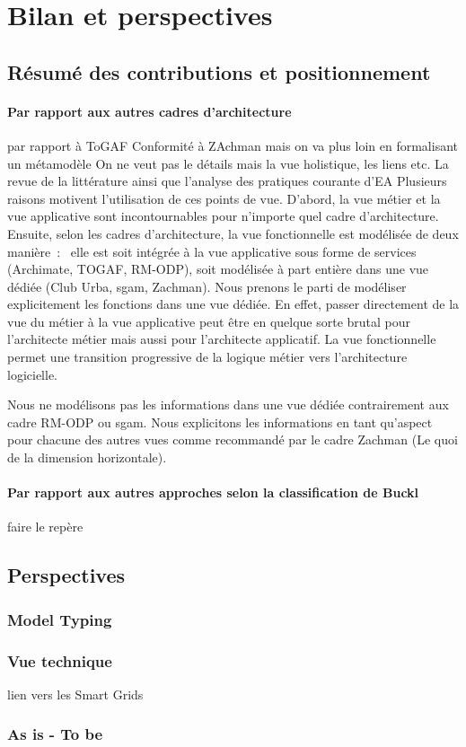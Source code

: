 \chapter{Bilan et perspectives}
\label{ch:bilan}

\PartialToc

\section{Résumé des contributions et positionnement}



\subsubsection{Par rapport aux autres cadres d'architecture}
par rapport à ToGAF
Conformité à ZAchman mais on va plus loin en formalisant un métamodèle
On ne veut pas le détails mais la vue holistique, les liens etc.
La revue de la littérature ainsi que
l'analyse des pratiques courante d'EA Plusieurs raisons
motivent l'utilisation de ces points de vue. D'abord, la vue métier et la vue
applicative sont incontournables pour n'importe quel cadre d'architecture.
Ensuite, selon les cadres d'architecture, la vue fonctionnelle est modélisée de
deux manière~:~ elle est soit intégrée à la vue applicative sous forme de
services (Archimate, TOGAF, RM-ODP), soit modélisée à part entière dans une vue
dédiée (Club Urba, \gls{sgam}, Zachman). Nous prenons le parti de modéliser
explicitement les fonctions dans une vue dédiée. En effet, passer directement
de la vue du métier à la vue applicative peut être en quelque sorte brutal pour
l'architecte métier mais aussi pour l'architecte applicatif. La vue fonctionnelle
permet une transition progressive de la logique métier vers l'architecture
logicielle.

Nous ne modélisons pas les informations dans une vue dédiée contrairement aux
cadre RM-ODP ou \gls{sgam}. Nous explicitons les informations en tant qu'aspect
pour chacune des autres vues comme recommandé par le cadre Zachman (Le quoi de
la dimension horizontale).

            \subsubsection{Par rapport aux autres approches selon la classification de Buckl}

        faire le repère 

\section{Perspectives}

    \subsection{Model Typing}

    \subsection{Vue technique}
    lien vers les Smart Grids
    
    \subsection{As is - To be}
